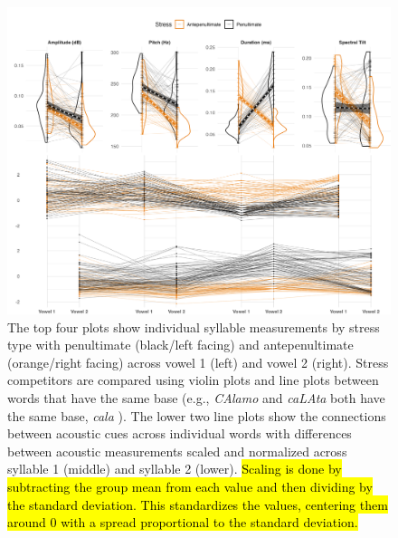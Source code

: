 \begin{figure}[H]
  \centering
  \includegraphics[width=1\linewidth]{visuals/raw_acoustics_combined.jpeg}
  \caption{The top four plots show individual syllable measurements by stress type with penultimate (black/left facing) and antepenultimate (orange/right facing)  across vowel 1 (left) and vowel 2 (right). Stress competitors are compared using violin plots and line plots between words that have the same base (e.g., \textit{CAlamo} and \textit{caLAta} both have the same base, \textit{cala} ). The lower two line plots show the connections between acoustic cues across individual words with differences between acoustic measurements scaled and normalized across syllable 1 (middle) and syllable 2 (lower). \hl{Scaling is done by subtracting the group mean from each value and then dividing by the standard deviation. This standardizes the values, centering them around 0 with a spread proportional to the standard deviation.}}
  \label{fig:raw_acoustics}
\end{figure}


